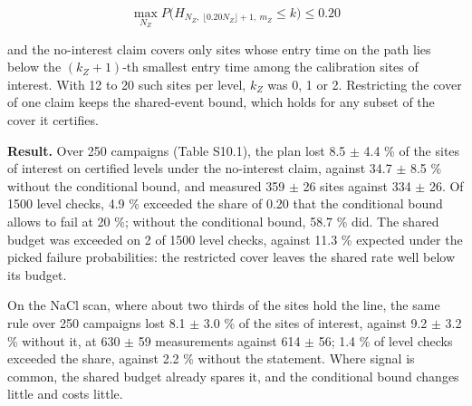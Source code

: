 \documentclass{iopjournal}
\begin{document}
\[
\max_{N_Z} P\big(H_{N_Z,\ \lfloor 0.20 N_Z \rfloor + 1,\ m_Z} \le k\big) \le 0.20
\]

and the no-interest claim covers only sites whose entry time on the path lies below the \((k_Z + 1)\)-th smallest entry time among the calibration sites of interest. With 12 to 20 such sites per level, \(k_Z\) was 0, 1 or 2. Restricting the cover of one claim keeps the shared-event bound, which holds for any subset of the cover it certifies.

\textbf{Result.} Over 250 campaigns (Table S10.1), the plan lost 8.5 \ensuremath{\pm} 4.4 \% of the sites of interest on certified levels under the no-interest claim, against 34.7 \ensuremath{\pm} 8.5 \% without the conditional bound, and measured 359 \ensuremath{\pm} 26 sites against 334 \ensuremath{\pm} 26. Of 1500 level checks, 4.9 \% exceeded the share of 0.20 that the conditional bound allows to fail at 20 \%; without the conditional bound, 58.7 \% did. The shared budget was exceeded on 2 of 1500 level checks, against 11.3 \% expected under the picked failure probabilities: the restricted cover leaves the shared rate well below its budget.

On the NaCl scan, where about two thirds of the sites hold the line, the same rule over 250 campaigns lost 8.1 \ensuremath{\pm} 3.0 \% of the sites of interest, against 9.2 \ensuremath{\pm} 3.2 \% without it, at 630 \ensuremath{\pm} 59 measurements against 614 \ensuremath{\pm} 56; 1.4 \% of level checks exceeded the share, against 2.2 \% without the statement. Where signal is common, the shared budget already spares it, and the conditional bound changes little and costs little.
\end{document}
